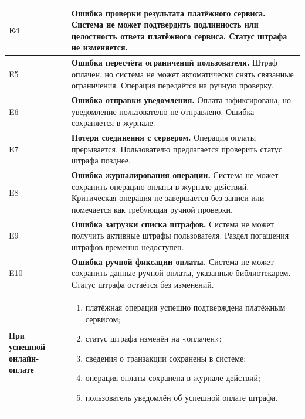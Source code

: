 \documentclass[12pt,a4paper]{article}
\begin{document}
\begin{xltabular}{\textwidth}{
				|>{\raggedright\arraybackslash}p{2.7cm}
				|>{\raggedright\arraybackslash}X|
			}
			E4 &
			\textbf{Ошибка проверки результата платёжного сервиса.}
			Система не может подтвердить подлинность или целостность ответа
			платёжного сервиса. Статус штрафа не изменяется. \\
			\hline
			
			E5 &
			\textbf{Ошибка пересчёта ограничений пользователя.}
			Штраф оплачен, но система не может автоматически снять связанные
			ограничения. Операция передаётся на ручную проверку. \\
			\hline
			
			E6 &
			\textbf{Ошибка отправки уведомления.}
			Оплата зафиксирована, но уведомление пользователю не отправлено.
			Ошибка сохраняется в журнале. \\
			\hline
			
			E7 &
			\textbf{Потеря соединения с сервером.}
			Операция оплаты прерывается. Пользователю предлагается проверить
			статус штрафа позднее. \\
			\hline
			
			E8 &
			\textbf{Ошибка журналирования операции.}
			Система не может сохранить операцию оплаты в журнале действий.
			Критическая операция не завершается без записи или помечается как
			требующая ручной проверки. \\
			\hline
			
			E9 &
			\textbf{Ошибка загрузки списка штрафов.}
			Система не может получить активные штрафы пользователя. Раздел
			погашения штрафов временно недоступен. \\
			\hline
			
			E10 &
			\textbf{Ошибка ручной фиксации оплаты.}
			Система не может сохранить данные ручной оплаты, указанные
			библиотекарем. Статус штрафа остаётся без изменений. \\
			\hline
			
			
			\textbf{При успешной онлайн-оплате} &
			\begin{enumerate}
				\item платёжная операция успешно подтверждена платёжным сервисом;
				\item статус штрафа изменён на «оплачен»;
				\item сведения о транзакции сохранены в системе;
				\item операция оплаты сохранена в журнале действий;
				\item пользователь уведомлён об успешной оплате штрафа.
			\end{enumerate} \\
			\hline
			

\end{xltabular}
\end{document}
